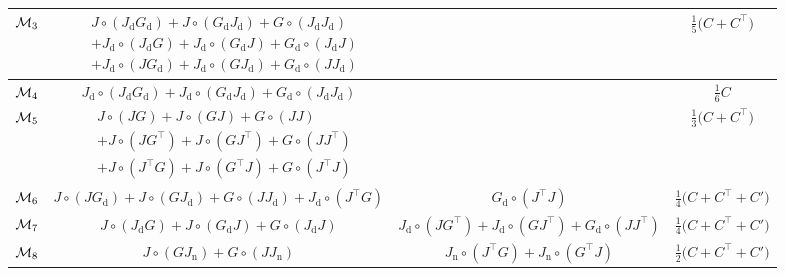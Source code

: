 \begin{table}[H]
\begin{tabular}{ |c|c|c|c| }
    	\hline
		
		$\mathcal{M}_3$ & \rule{0pt}{2.7em}$\displaystyle\begin{aligned}
						& J \circ (J_\mathrm{d} G_\mathrm{d}) + J \circ (G_\mathrm{d} J_\mathrm{d}) + G \circ (J_\mathrm{d} J_\mathrm{d}) \\
						& + J_\mathrm{d} \circ (J_\mathrm{d} G) + J_\mathrm{d} \circ (G_\mathrm{d} J) + G_\mathrm{d} \circ (J_\mathrm{d} J) \\
						& + J_\mathrm{d} \circ (J G_\mathrm{d}) + J_\mathrm{d} \circ (G J_\mathrm{d}) + G_\mathrm{d} \circ (J J_\mathrm{d})
					\end{aligned}$\rule[-2em]{0pt}{1em} & & $\frac{1}{5} \big(C + C^\top\big)$ \\
					
		\hline
		
		$\mathcal{M}_4$ & $ J_\mathrm{d} \circ (J_\mathrm{d} G_\mathrm{d}) + J_\mathrm{d} \circ (G_\mathrm{d} J_\mathrm{d}) + G_\mathrm{d} \circ (J_\mathrm{d} J_\mathrm{d}) $ & & $ \frac{1}{6} C$ \\
		
		\hline
		
		$\mathcal{M}_5$ & \rule{0pt}{2.7em}$\displaystyle\begin{aligned}
						& J \circ (J G) + J \circ (G J) + G \circ (J J) \\
						& + J \circ (J G^\top) + J \circ (G J^\top) + G \circ (J J^\top) \\
						& + J \circ (J^\top G) + J \circ (G^\top J) + G \circ (J^\top J)
					\end{aligned}$\rule[-2em]{0pt}{1em} & & $\frac{1}{3} \big(C + C^\top\big)$ \\

		\hline
		
		$\mathcal{M}_6$ & $J \circ (J G_\mathrm{d}) + J \circ (G J_\mathrm{d}) + G \circ (J J_\mathrm{d}) + J_\mathrm{d} \circ (J^\top G)$ & $G_\mathrm{d} \circ (J^\top J)$ & $\frac{1}{4} \big(C + C^\top + C' \big)$ \\
		
		\hline

		$\mathcal{M}_7$ & $J \circ (J_\mathrm{d} G) + J \circ (G_\mathrm{d} J) + G \circ (J_\mathrm{d} J)$ & $J_\mathrm{d} \circ (J G^\top) + J_\mathrm{d} \circ (G J^\top) + G_\mathrm{d} \circ (J J^\top)$ & $ \frac{1}{4} \big(C + C^\top + C' \big)$ \\
		
		\hline
		
		$\mathcal{M}_8$ & $J \circ (G J_\mathrm{n}) + G \circ (J J_\mathrm{n})$ & $J_\mathrm{n} \circ (J^\top G) + J_\mathrm{n} \circ (G^\top J)$ & $\frac{1}{2} \big(C + C^\top + C' \big)$ \\
		

\end{tabular}
\end{table}
